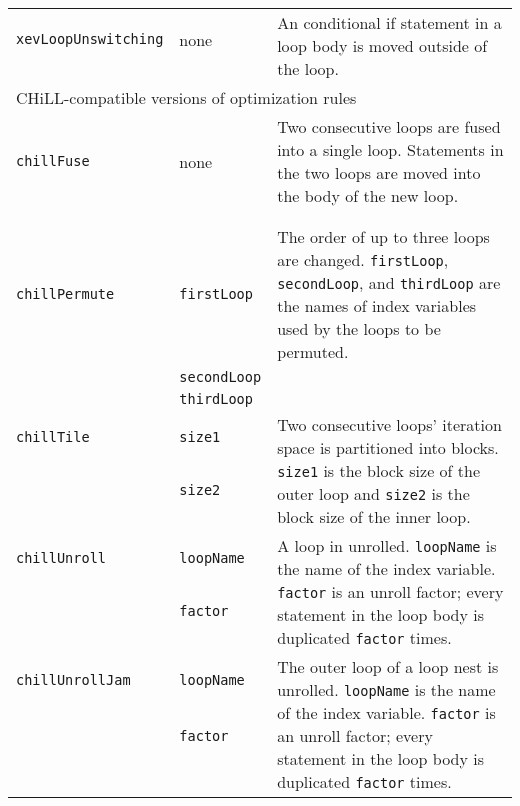\begin{longtable}[l]{l|l|l}
\texttt{xevLoopUnswitching} & none & \multirow{2}{9cm}{An conditional
if statement in a loop body is moved outside of the loop.} \\
&&\\ \hline


 \multicolumn{3}{l}{CHiLL-compatible versions of optimization rules}\\\hline

 \texttt{chillFuse} & none & \multirow{1}{9cm}{Two consecutive loops are
 fused into a single loop. Statements in the two loops are moved into
 the body of the new loop.} \\
 &&\\ &&\\ \hline

 \texttt{chillPermute} & \texttt{firstLoop} & \multirow{1}{9cm}{The order of up to
 three loops are changed. \texttt{firstLoop}, \texttt{secondLoop}, and
 \texttt{thirdLoop} are the names of index variables used by the loops
 to be permuted.} \\
 &\texttt{secondLoop}&\\ &\texttt{thirdLoop}&\\ \hline


\texttt{chillTile} & \texttt{size1} & \multirow{3}{9cm}{
Two consecutive loops' iteration space is partitioned into blocks. \texttt{size1} is
 the block size of the outer loop and  \texttt{size2} is the block size of the inner loop.} \\
& \texttt{size2} &\\
&  &\\ \hline

\texttt{chillUnroll} & \texttt{loopName}  & \multirow{3}{9cm}{A loop in
 unrolled. \texttt{loopName} is the name of the index
 variable. \texttt{factor} is an unroll factor; every
 statement in the loop body is duplicated \texttt{factor} times.} \\ &
 \texttt{factor} & \\ &&\\ \hline

\texttt{chillUnrollJam} & \texttt{loopName} & \multirow{4}{9cm}{The outer
 loop of a loop nest is unrolled. \texttt{loopName} is the name of the
 index variable. \texttt{factor} is an unroll factor; every statement in
 the loop body is duplicated \texttt{factor} times.} \\ &
 \texttt{factor} & \\ &&\\ &&\\  \hline
\end{longtable}

